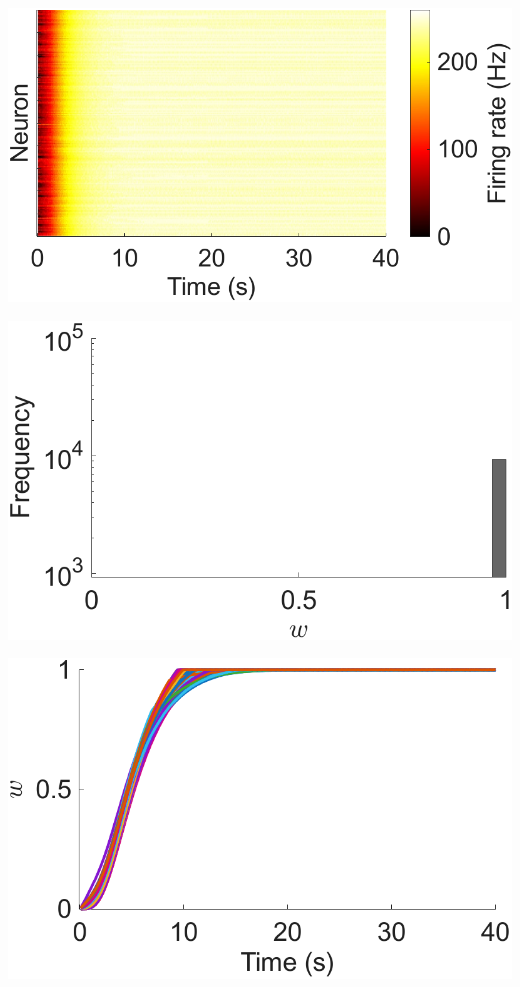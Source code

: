 \documentclass[utf8]{frontiers_suppmat} %
\begin{document}
\begin{subfigure}
\begin{minipage}[b]{0.32\textwidth}
        \caption{}
    \end{minipage}%
\setcounter{figure}{1}
\setcounter{subfigure}{3}
    \begin{minipage}[b]{0.32\textwidth}
        \includegraphics[width=\linewidth]{mulSTDP/Hz.pdf}
        \caption{}
    \end{minipage}%
\setcounter{figure}{1}
\setcounter{subfigure}{4}
    \begin{minipage}[b]{0.32\textwidth}
        \includegraphics[width=\linewidth]{mulSTDP/weights_E2E_histogram.pdf}
        \caption{}
    \end{minipage}%
\setcounter{figure}{1}
\setcounter{subfigure}{5}
    \begin{minipage}[b]{0.32\textwidth}
        \includegraphics[width=\linewidth]{mulSTDP/weights_E2E_traces.pdf}

\end{minipage}
\end{subfigure}
\end{document}

